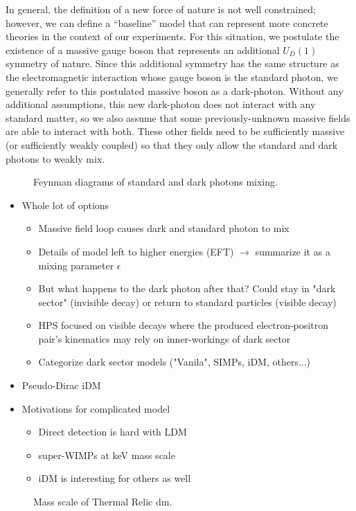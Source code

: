 In general, the definition of a new force of nature is not well constrained; however, we can
define a ``baseline'' model that can represent more concrete theories in the context of our experiments.
For this situation, we postulate the existence of a massive gauge boson that represents an additional
$U_D(1)$ symmetry of nature. Since this additional symmetry has the same structure as the electromagnetic
interaction whose gauge boson is the standard photon, we generally refer to this postulated massive boson
as a \gls{dark-photon}. Without any additional assumptions, this new \gls{dark-photon} does not interact
with any standard matter, so we also assume that some previously-unknown massive fields are able to interact with
both. These other fields need to be sufficiently massive (or sufficiently weakly coupled) so that they only allow
the standard and dark photons to weakly mix.

\begin{figure}
    \centering
    
    \caption{Feynman diagrams of standard and dark photons mixing.}
    \label{fig:photon-mixing}
\end{figure}

\begin{itemize}
    \item Whole lot of options
          \begin{itemize}
              \item Massive field loop causes dark and standard photon to mix
              \item Details of model left to higher energies (EFT) $\rightarrow$ summarize it as a mixing parameter $\epsilon$ \cite{kinetic-mixing-1986}
              \item But what happens to the dark photon after that? Could stay in "dark sector" (invisible decay) or return to standard particles (visible decay)
              \item HPS focused on visible decays where the produced electron-positron pair's kinematics may rely on inner-workings of dark sector
              \item Categorize dark sector models ("Vanila", SIMPs, iDM, others...)
          \end{itemize}
    \item Pseudo-Dirac iDM
    \item Motivations for complicated model
          \begin{itemize}
              \item Direct detection is hard with LDM \cite{ldmconstraints-2019}
              \item super-WIMPs at keV mass scale \cite{superwimps-2008}
              \item iDM is interesting for others as well \cite{darkseaquest-2018}
          \end{itemize}
\end{itemize}

\begin{figure}
    \centering
    
    \caption{Mass scale of Thermal Relic \gls{dm}.}
    \label{fig:dm-mass-scale}
\end{figure}
